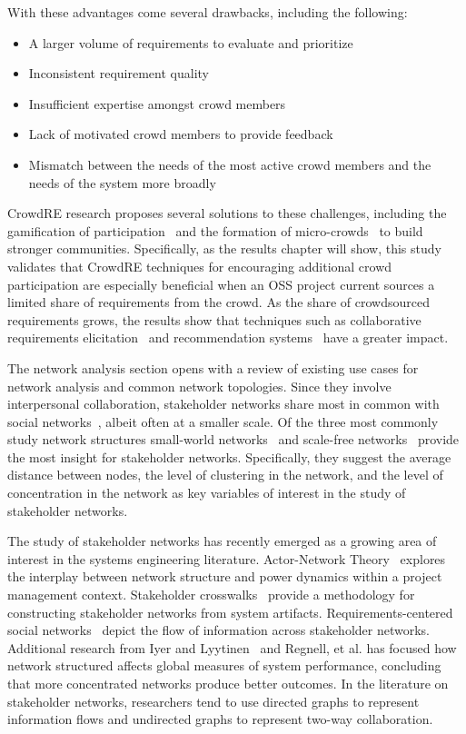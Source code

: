 With these advantages come several drawbacks, including the following:

\begin{itemize}
    \item A larger volume of requirements to evaluate and prioritize
    \item Inconsistent requirement quality
    \item Insufficient expertise amongst crowd members
    \item Lack of motivated crowd members to provide feedback
    \item Mismatch between the needs of the most active crowd members and the needs of the system more broadly
\end{itemize}

CrowdRE research proposes several solutions to these challenges, including the gamification of participation~\cite{gerth} and the formation of micro-crowds~\cite{levy} to build stronger communities. Specifically, as the results chapter will show, this study validates that CrowdRE techniques for encouraging additional crowd participation are especially beneficial when an OSS project current sources a limited share of requirements from the crowd. As the share of crowdsourced requirements grows, the results show that techniques such as collaborative requirements elicitation~\cite{lim} and recommendation systems~\cite{mobasher} have a greater impact.

The network analysis section opens with a review of existing use cases for network analysis and common network topologies. Since they involve interpersonal collaboration, stakeholder networks share most in common with social networks~\cite{moreno}, albeit often at a smaller scale. Of the three most commonly study network structures small-world networks~\cite{watts} and scale-free networks~\cite{barbasi} provide the most insight for stakeholder networks. Specifically, they suggest the average distance between nodes, the level of clustering in the network, and the level of concentration in the network as key variables of interest in the study of stakeholder networks.

The study of stakeholder networks has recently emerged as a growing area of interest in the systems engineering literature. Actor-Network Theory~\cite{missonier} explores the interplay between network structure and power dynamics within a project management context. Stakeholder crosswalks~\cite{wood} provide a methodology for constructing stakeholder networks from system artifacts. Requirements-centered social networks~\cite{damian} depict the flow of information across stakeholder networks. Additional research from Iyer and Lyytinen~\cite{iyer} and Regnell, et al. \cite{regnell} has focused how network structured affects global measures of system performance, concluding that more concentrated networks produce better outcomes. In the literature on stakeholder networks, researchers tend to use directed graphs to represent information flows and undirected graphs to represent two-way collaboration.

